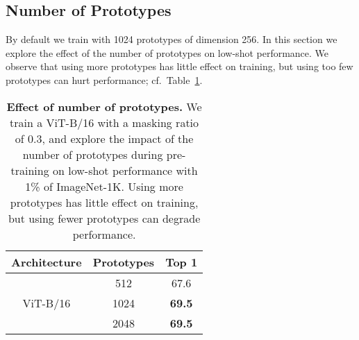 \documentclass{article}
\begin{document}
\subsection{Number of Prototypes}
By default we train with 1024 prototypes of dimension 256. In this section we explore the effect of the number of prototypes on low-shot performance.
We observe that using more prototypes has little effect on training, but using too few prototypes can hurt performance; cf.~Table~\ref{tb:prototypes}.
\begin{table}[h]
    \centering
    \caption{{\bf Effect of number of prototypes.} We train a ViT-B/16 with a masking ratio of 0.3, and explore the impact of the number of prototypes during pre-training on low-shot performance with 1\% of ImageNet-1K. Using more prototypes has little effect on training, but using fewer prototypes can degrade performance.}
    \label{tb:prototypes}
    \begin{tabular}{c c | c}
        \bf Architecture & \bf Prototypes & \bf Top 1 \\\toprule
        \multirow{3}{*}{ViT-B/16} & 512 & 67.6 \\
        & 1024 & \bf\cellcolor{fbApp} 69.5 \\
        & 2048 & \bf\cellcolor{fbApp} 69.5 \\
        \bottomrule
    \end{tabular}
\end{table}
\end{document}
